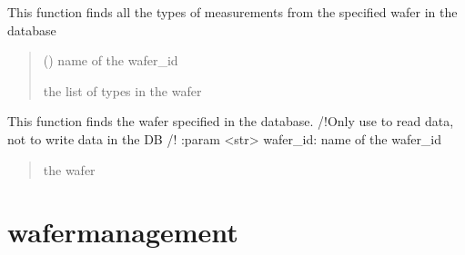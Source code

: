 \documentclass[letterpaper,10pt,english]{sphinxmanual}
\begin{document}

\begin{fulllineitems}
\label{\detokenize{getter:getter.get_types}}
\pysigstartsignatures
{}
\pysigstopsignatures
\sphinxAtStartPar
This function finds all the types of measurements from the specified wafer in the database
\begin{quote}\begin{description}
\sphinxAtStartPar
{} () \textendash{} name of the wafer\_id

\sphinxAtStartPar
the list of types in the wafer

\end{description}\end{quote}

\end{fulllineitems}


\begin{fulllineitems}
\label{\detokenize{getter:getter.get_wafer}}
\pysigstartsignatures
{}
\pysigstopsignatures
\sphinxAtStartPar
This function finds the wafer specified in the database. /!Only use to read data, not to write data in the DB /!
:param \textless{}str\textgreater{} wafer\_id: name of the wafer\_id
\begin{quote}\begin{description}
\sphinxAtStartPar
the wafer

\end{description}\end{quote}

\end{fulllineitems}


\sphinxstepscope


\chapter{wafer\sphinxhyphen{}management}
\label{\detokenize{modules:wafer-management}}\label{\detokenize{modules::doc}}
\sphinxstepscope
\end{document}
